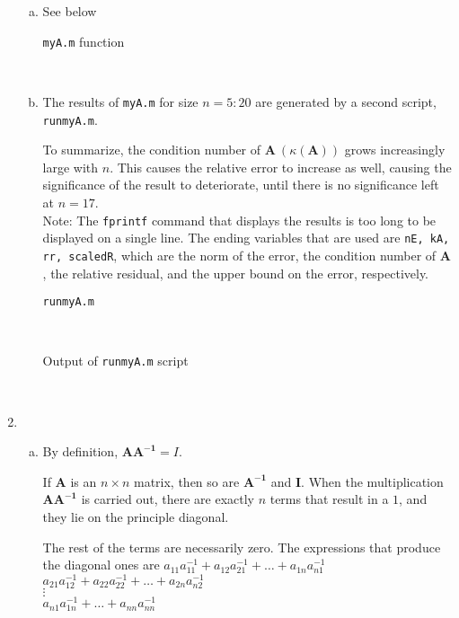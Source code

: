 \documentclass[11pt]{article}
\begin{document}
\begin{enumerate}
\begin{enumerate}[(a)]
		\item See below

			\begin{center}
				\texttt{myA.m} function
			\end{center}
			 \

		\item The results of \texttt{myA.m} for size $n =5:20$ are generated by a second script, \texttt{runmyA.m}.

			To summarize,
			the condition number of $\mathbf{A}\ (\kappa(\mathbf{A}))$ grows increasingly large with $n$. This causes the relative
			error to increase as well, causing the significance of the result to deteriorate, until there is no significance left
			at $n=17$. \\

			Note: The \texttt{fprintf} command that displays the results is too long to be displayed on a single line. The ending
			variables that are used are \texttt{nE, kA, rr, scaledR}, which are the norm of the error, the condition number of
			$\mathbf{A}$, the relative residual, and the upper bound on the error, respectively.

			\begin{center}
				\texttt{runmyA.m}
			\end{center}
			 \

			\begin{center}
				Output of \texttt{runmyA.m} script
			\end{center}
			 \

	\end{enumerate}

	\item

		\begin{enumerate}[(a)]
			\item By definition, $\mathbf{AA^{-1}} = I$.

				If $\mathbf{A}$ is an $n\times n$ matrix, then so are $\mathbf{A^{-1}}$ and $\mathbf{I}$. When the multiplication
				$\mathbf{AA^{-1}}$ is carried out, there are exactly $n$ terms that result in a $1$, and they lie on the principle
				diagonal.

				The rest of the terms are necessarily zero. The expressions that produce the diagonal ones are
				$a_{11}a^{-1}_{11} + a_{12}a^{-1}_{21} + \dots + a_{1n}a^{-1}_{n1}$ \\
				$a_{21}a^{-1}_{12} + a_{22}a^{-1}_{22} + \dots  + a_{2n}a^{-1}_{n2}$ \\
				$\vdots$ \\
				$a_{n1}a^{-1}_{1n} + \dots + a_{nn}a^{-1}_{nn}$ \\


\end{enumerate}
\end{enumerate}
\end{document}
